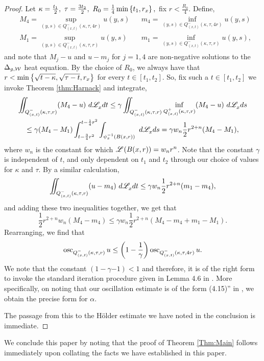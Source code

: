 \documentclass[a4paper, 12pt]{amsart}
\begin{document}
\begin{proof}
Let 
$\kappa = \frac{t_1}{2},\ \tau = \frac{3t_2}{2},\ R_0 = \frac{1}{4} \min\left\{t_1, r_x\right\},$ fix $r < \frac{R_0}{4}$.
Define, 
\begin{align*}
&M_4 = \sup_{(y,s) \in Q^{-}_{(x,t)}(\kappa, \tau, 4r)} u(y,s) &&m_4 = \inf_{(y,s) \in Q^{-}_{(x,t)}(\kappa, \tau, 4r)} u(y,s) \\
&M_1 = \sup_{(y,s) \in Q^{-}_{(x,t)}(\kappa, \tau, r)} u(y,s) &&m_1 = \inf_{(y,s) \in Q^{-}_{(x,t)}(\kappa, \tau, r)} u(y,s), 
\end{align*} 
and note that $M_j - u$ and $u - m_j$ for $j = 1, 4$ are non-negative
solutions to the $\Delta_{g,\mathcal{W}}$ heat equation.
By the choice of $R_0$,
we always have that $r < \min\left\{ \sqrt{t - \kappa}, \sqrt{\tau - t}, r_x\right\}$
for every $t \in [t_1, t_2]$. 
So, fix such a $t \in [t_1, t_2]$ we invoke Theorem \ref{thm:Harnack} and integrate,
\begin{multline*}
\iint_{Q^-_{(x,t)}(\kappa,\tau,r)} (M_4 - u)\ d\Leb_x dt 
	\leq \gamma \iint_{Q^-_{(x,t)}(\kappa,\tau,r)} \inf_{Q^+_{(x,t)}(\kappa, \tau, r)} (M_4 - u)\ d\Leb_x ds \\
	\leq \gamma (M_4 - M_1) \int_{t- \frac{3}{4}r^2}^{t - \frac{1}{4}r^2} \int_{\psi_x^{-1}(B(x,r))}\ d\Leb_x ds
	= \gamma w_n  \frac{1}{2}r^{2+n} (M_4 - M_1),$$
\end{multline*}
where $w_n$ is the constant for which $\mathscr{L}^{{}}(B(x,r)) = w_n r^n$.
Note that the constant $\gamma$ is independent of $t$, and only 
dependent on $t_1$ and $t_2$ through our choice
of values for $\kappa$ and $\tau$. 
By a similar calculation, 
$$
\iint_{Q^-_{(x,t)}(\kappa,\tau,r)} (u - m_4)\ d\Leb_x dt \leq \gamma w_n \frac{1}{2}r^{2+n} (m_1 - m_4),$$
and adding these two inequalities together, 
we get that
$$
\frac{1}{2}r^{2+n} w_n (M_4 - m_4) \leq \gamma w_n \frac{1}{2}r^{2+n} (M_4 - m_4 +m_1 - M_1).$$
Rearranging, we find that 
$$
\operatorname{osc}_{Q^{-}_{(x,t)}(\kappa, \tau, r)} u \leq \left(1 - \frac{1}{\gamma}\right) \operatorname{osc}_{Q^{-}_{(x,t)}(\kappa, \tau, 4r)} u.$$
We note that the constant $(1 - \gamma{-1}) < 1$
and therefore, it is of the right form to invoke the
standard iteration procedure given in Lemma 4.6 in \cite{Lieberman}. 
More specifically, on noting that
our oscillation estimate is of the form (4.15)'' in \cite{Lieberman},
we obtain the precise form for $\alpha$.

The passage from this to the Hölder estimate
we have noted in the conclusion is immediate. 
\end{proof}

We conclude this paper by noting that the proof of Theorem \ref{Thm:Main}
follows immediately upon collating the facts we have established
in this paper.

\printbibliography
\end{document}
